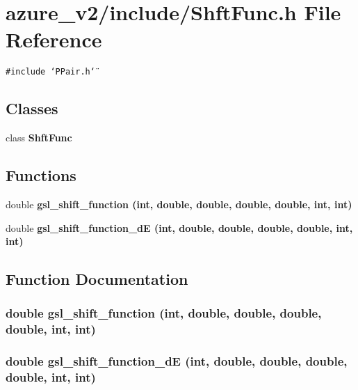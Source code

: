 \section{azure\_\-v2/include/Shft\-Func.h File Reference}
\label{ShftFunc_8h}
{\tt \#include \char`\"{}PPair.h\char`\"{}}\par
\subsection*{Classes}
\begin{CompactItemize}
\item 
class \bf{Shft\-Func}
\end{CompactItemize}
\subsection*{Functions}
\begin{CompactItemize}
\item 
double \bf{gsl\_\-shift\_\-function} (int, double, double, double, double, int, int)
\item 
double \bf{gsl\_\-shift\_\-function\_\-d\-E} (int, double, double, double, double, int, int)
\end{CompactItemize}


\subsection{Function Documentation}
\subsubsection{\setlength{\rightskip}{0pt plus 5cm}double gsl\_\-shift\_\-function (int, double, double, double, double, int, int)}\label{ShftFunc_8h_c0a20f296c0e528e465a6f4e5270e485}


\subsubsection{\setlength{\rightskip}{0pt plus 5cm}double gsl\_\-shift\_\-function\_\-d\-E (int, double, double, double, double, int, int)}\label{ShftFunc_8h_4a6ff3a79a449555fad764931169a566}


